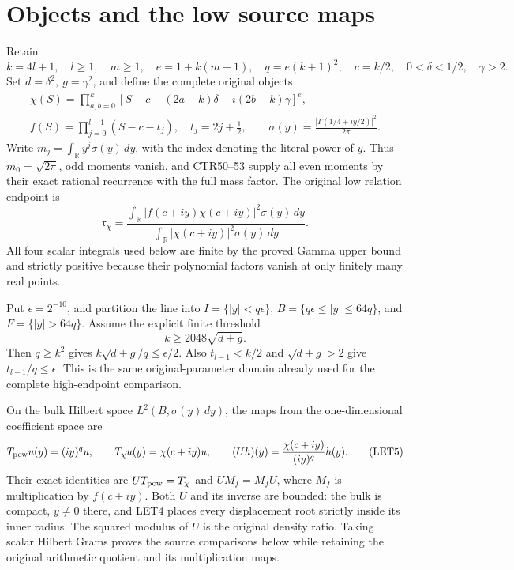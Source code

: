 \documentclass[11pt,a4paper]{article}
\begin{document}
\section{Objects and the low source maps}
Retain
\[
 k=4l+1,\quad l\ge1,\quad m\ge1,\quad e=1+k(m-1),\quad
 q=e(k+1)^2,\quad c=k/2,\quad 0<\delta<1/2,\quad\gamma>2.
 \tag{LET1}
\]
Set \(d=\delta^2,\ g=\gamma^2\), and define the complete original objects
\[
\begin{gathered}
 \chi(S)=\prod_{a,b=0}^k
 [S-c-(2a-k)\delta-i(2b-k)\gamma]^e,\\
 f(S)=\prod_{j=0}^{l-1}(S-c-t_j),\quad t_j=2j+\tfrac12,
 \qquad \sigma(y)=\frac{|\Gamma(1/4+iy/2)|^2}{2\pi}.
\end{gathered}\tag{LET2}
\]
Write \(m_j=\int_{\mathbb R}y^j\sigma(y)\,dy\), with the index denoting the
literal power of \(y\). Thus \(m_0=\sqrt{2\pi}\), odd moments vanish, and
CTR50--53 supply all even moments by their exact rational recurrence with
the full mass factor. The original low relation endpoint is
\[
 \mathfrak r_\chi=
 \frac{\int_{\mathbb R}|f(c+iy)\chi(c+iy)|^2\sigma(y)\,dy}
      {\int_{\mathbb R}|\chi(c+iy)|^2\sigma(y)\,dy}.
 \tag{LET3}
\]
All four scalar integrals used below are finite by the proved Gamma upper
bound and strictly positive because their polynomial factors vanish at
only finitely many real points.

Put \(\epsilon=2^{-10}\), and partition the line into
\(I=\{|y|<q\epsilon\}\), \(B=\{q\epsilon\le |y|\le64q\}\), and
\(F=\{|y|>64q\}\). Assume the explicit finite threshold
\[
 k\ge2048\sqrt{d+g}.
 \tag{LET4}
\]
Then \(q\ge k^2\) gives \(k\sqrt{d+g}/q\le\epsilon/2\).
Also \(t_{l-1}<k/2\) and \(\sqrt{d+g}>2\) give
\(t_{l-1}/q\le\epsilon\). This is the same original-parameter domain
already used for the complete high-endpoint comparison.

On the bulk Hilbert space \(L^2(B,\sigma(y)\,dy)\), the maps from the
one-dimensional coefficient space are
\[
 T_{\rm pow}u(y)=(iy)^q u,\qquad
 T_\chi u(y)=\chi(c+iy)u,\qquad
 (Uh)(y)=\frac{\chi(c+iy)}{(iy)^q}h(y).
 \tag{LET5}
\]
Their exact identities are \(UT_{\rm pow}=T_\chi\) and
\(UM_f=M_fU\), where \(M_f\) is multiplication by \(f(c+iy)\).
Both \(U\) and its inverse are bounded: the bulk is compact, \(y\ne0\)
there, and LET4 places every displacement root strictly inside its inner
radius. The squared modulus of \(U\) is the original density ratio.
Taking scalar Hilbert Grams proves the source comparisons below while
retaining the original arithmetic quotient and its multiplication maps.
\end{document}
